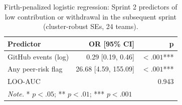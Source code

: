 \begin{table}[ht]
\centering
\scriptsize
\setlength{\tabcolsep}{4pt}
\renewcommand{\arraystretch}{0.88}
\caption{Firth-penalized logistic regression: Sprint 2 predictors of low contribution or withdrawal in the subsequent sprint (cluster-robust SEs, 24 teams).}
\label{tab:firth_s2s3}
\begin{tabular}{l r r}
\toprule
\textbf{Predictor} & \textbf{OR [95\% CI]} & \textbf{p} \\
\midrule
GitHub events (log) & 0.29 [0.19, 0.46] & $< .001$*** \\
Any peer-risk flag & 26.68 [4.59, 155.09] & $< .001$*** \\
\midrule
LOO-AUC & \multicolumn{2}{r}{0.943} \\
\midrule
\multicolumn{3}{l}{\textit{Note.} * $p < .05$; ** $p < .01$; *** $p < .001$} \\
\bottomrule
\end{tabular}
\end{table}
